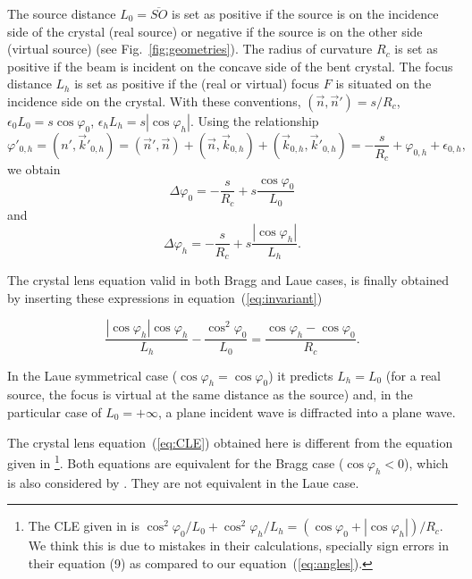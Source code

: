 \documentclass[preprint]{iucr}              %
\begin{document}
The source distance $L_0=\overline{SO}$ is set as positive if the source is on the incidence side of the crystal (real source) or negative if the source is on the other side (virtual source) (see Fig.~\ref{fig:geometries}). The radius of curvature $R_c$ is set as positive if the beam is incident on the concave side of the bent crystal. The focus distance $L_h$ is set as positive if the (real or virtual) focus $F$ is situated on the incidence side on the crystal. With these conventions, $(\vec n,\vec n')=s/R_c$, $\epsilon_0 L_0 = s \cos\varphi_0$,  $\epsilon_h L_h = s |\cos\varphi_h|$. Using the relationship
\begin{equation}
    \varphi'_{0,h} = 
    (n',  \vec k'_{0,h}) = 
    (\vec n', \vec n) + (\vec n,\vec k_{0,h}) + (\vec k_{0,h}, \vec k'_{0,h}) = -\frac{s}{R_c} + \varphi_{0,h} + \epsilon_{0,h},
\end{equation}
we obtain
\begin{equation}
\label{eq:angles}
\Delta \varphi_0 =  - \frac{s}{R_c} + s \frac{\cos\varphi_0}{L_0}
\end{equation}
and 
\begin{equation}
\label{eq:angles2}
\Delta \varphi_h = - \frac{s}{R_c} +  s \frac{|\cos\varphi_h|}{L_h}.
\end{equation}

The crystal lens equation valid in both Bragg and Laue cases, is finally obtained by inserting these expressions in equation~(\ref{eq:invariant})

\begin{equation}
\label{eq:CLE}
\frac{|\cos\varphi_h| \cos\varphi_h}{L_h} - \frac{\cos^2\varphi_0}{L_0} = \frac{\cos\varphi_h - \cos\varphi_0}{R_c}.
\end{equation}


In the Laue symmetrical case ($\cos\varphi_h=\cos\varphi_0$) it predicts $L_h=L_0$ (for a real source, the focus is virtual at the same distance as the source) and, in the particular case of $L_0=+\infty$, a plane incident wave is diffracted into a plane wave.

The crystal lens equation~(\ref{eq:CLE}) obtained here is different from the equation given in \cite{CK}\footnote{The CLE given in \cite{CK} is 
$
\cos^2\varphi_0/L_0 + \cos^2\varphi_h/L_h = (\cos\varphi_0 + |\cos\varphi_h|)/R_c$.
We think this is due to mistakes in their calculations, specially sign errors in their equation (9) as compared to our equation~(\ref{eq:angles}). 
}.
Both equations are equivalent for the Bragg case ($\cos\varphi_h<0$), which is also considered by . They are not equivalent in the Laue case.
 
\end{document}
